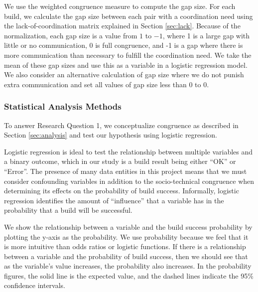 \documentclass[12pt,oneside]{book}
\begin{document}
We use the weighted congruence measure to compute the gap size. For each build, we calculate the gap size between each pair with a coordination need using the lack-of-coordination matrix explained in Section \ref{sec:lack}. Because of the normalization, each gap size is a value from $1$ to $-1$, where 1 is a large gap with little or no communication, 0 is full congruence, and -1 is a gap where there is more communication than necessary to fulfill the coordination need. We take the mean of these gap sizes and use this as a variable in a logistic regression model. We also consider an alternative calculation of gap size where we do not punish extra communication and set all values of gap size less than 0 to 0.

\subsubsection{Statistical Analysis Methods}


To answer Research Question 1, we conceptualize congruence as described in Section \ref{sec:analysis} and test our hypothesis using logistic regression.

Logistic regression is ideal to test the relationship between multiple variables and a binary outcome, which in our study is a build result being either ``OK'' or ``Error''. The presence of many data entities in this project means that we must consider confounding variables in addition to the socio-technical congruence when determining its effects on the probability of build success. Informally, logistic regression identifies the amount of ``influence'' that a variable has in the probability that a build will be successful.

We show the relationship between a variable and the build success probability by plotting the y-axis as the probability. We use probability because we feel that it is more intuitive than odds ratios or logistic functions. If there is a relationship between a variable and the probability of build success, then we should see that as the variable's value increases, the probability also increases. In the probability figures, the solid line is the expected value, and the dashed lines indicate the 95\% confidence intervals.
\end{document}
